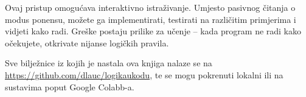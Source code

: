 Ovaj pristup omogućava interaktivno istraživanje.
Umjesto pasivnog čitanja o modus ponensu, možete ga implementirati, testirati na različitim primjerima i vidjeti kako radi.
Greške postaju prilike za učenje -- kada program ne radi kako očekujete, otkrivate nijanse logičkih pravila.

Sve bilježnice iz kojih je nastala ova knjiga nalaze se na \url{https://github.com/dlauc/logikaukodu}, te se mogu pokrenuti lokalni ili na sustavima poput Google Colabb-a.
